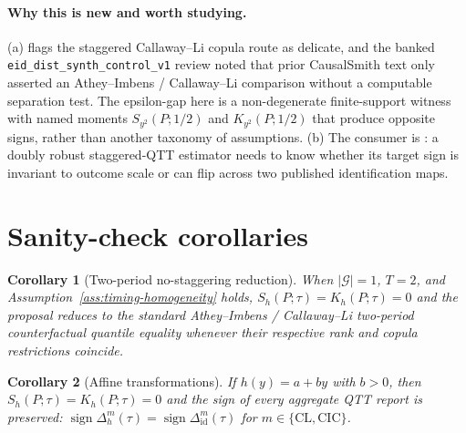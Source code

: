 \documentclass[11pt]{article}
\theoremstyle{definition}
\theoremstyle{plain}
\newtheorem{corollary}{Corollary}
\theoremstyle{remark}
\begin{document}
\paragraph{Why this is new and worth studying.}
(a) \citet[Section~2, final paragraph]{LiLin2024} flags the staggered
Callaway--Li copula route as delicate,
and the banked \texttt{eid\_dist\_synth\_control\_v1} review noted that prior
CausalSmith text only asserted an Athey--Imbens / Callaway--Li comparison without
a computable separation test.  The epsilon-gap here is a non-degenerate
finite-support witness with named moments \(S_{y^2}(P;1/2)\) and
\(K_{y^2}(P;1/2)\) that produce
opposite signs, rather than another taxonomy of assumptions.  (b) The consumer is
\citet[abstract and identification section]{MillerGalvao2026}: a doubly robust staggered-QTT estimator needs to know
whether its target sign is invariant to outcome scale or can flip across two
published identification maps.

\section{Sanity-check corollaries}
\begin{corollary}[Two-period no-staggering reduction]\label{cor:two-period}
When \(|\mathcal G|=1\), \(T=2\), and Assumption~\ref{ass:timing-homogeneity}
holds, \(S_h(P;\tau)=K_h(P;\tau)=0\) and the proposal reduces to the standard
Athey--Imbens / Callaway--Li two-period counterfactual quantile equality whenever
their respective rank and copula restrictions coincide.
\end{corollary}

\begin{corollary}[Affine transformations]\label{cor:affine}
If \(h(y)=a+by\) with \(b>0\), then \(S_h(P;\tau)=K_h(P;\tau)=0\) and the sign of every
aggregate QTT report is preserved: \(\operatorname{sign}\Delta^m_h(\tau)=
\operatorname{sign}\Delta^m_{\mathrm{id}}(\tau)\) for
\(m\in\{\mathrm{CL},\mathrm{CIC}\}\).
\end{corollary}
\end{document}
